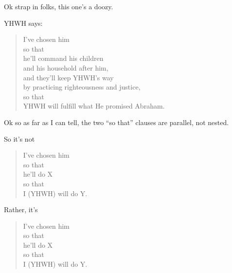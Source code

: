 {
}
{
}
{

	Ok strap in folks, this one's a doozy.
	
	YHWH says:
	\begin{quote}
	I've chosen him\\
	\hspace*{2em}so that\\
	\hspace*{4em}he'll command his children\\
	\hspace*{4em}and his household after him,\\
	\hspace*{4em}and they'll keep YHWH's way\\
	\hspace*{6em}by practicing righteousness and justice,\\
	\hspace*{2em}so that\\
	\hspace*{4em}YHWH will fulfill what He promised Abraham.
	\end{quote}

	Ok so as far as I can tell, the two ``so that'' clauses are parallel, not nested.
	
	So it's not

	\begin{quote}
	I've chosen him\\
	\hspace*{2em}so that\\
	\hspace*{4em}he'll do X\\
	\hspace*{4em}so that\\
	\hspace*{6em}I (YHWH) will do Y.
	\end{quote}

	Rather, it's

	\begin{quote}
	I've chosen him\\
	\hspace*{2em}so that\\
	\hspace*{4em}he'll do X\\
	\hspace*{2em}so that\\
	\hspace*{4em}I (YHWH) will do Y.
	\end{quote}

}
